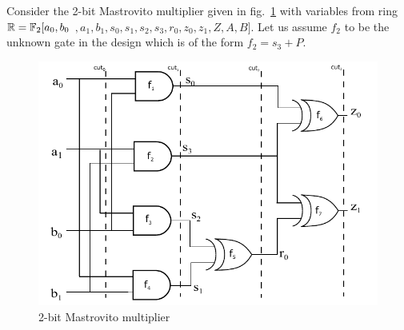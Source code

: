 \begin{Example}
Consider the 2-bit Mastrovito multiplier given in fig.~\ref{mas_c} with variables from ring ${\mathbb{R}}={\mathbb{F}}_2[a_0,b_0$ $,a_1,b_1,s_0,s_1,s_2,s_3,r_0,z_0,z_1,Z,A,B]$. Let us assume $f_2$ to be the unknown gate in the design which is of the form $f_2 = s_3 + P$.\\%
\begin{figure}[ht]
	\begin{center}
	\includegraphics[scale = 0.65]{mas_c}
	\end{center}
	\vspace{-2ex}
	\caption{2-bit Mastrovito multiplier}
	\label{mas_c}
	\vspace{-1ex}
\end{figure}\\

\end{Example}

